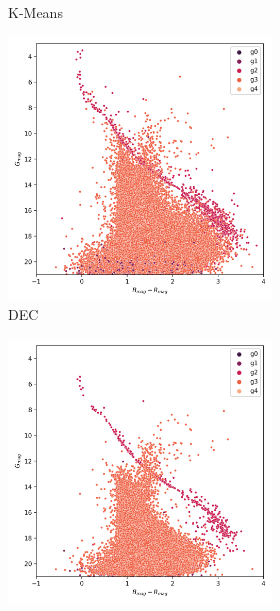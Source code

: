 \documentclass[11pt,a4paper,english,twocolumn]{article}
\begin{document}
\begin{figure}[htbp]
\begin{subfigure}{\columnwidth}
\begin{subfigure}[t]{0.3\textwidth}
      \caption{K-Means}
    \end{subfigure}
    \hfill
    \begin{subfigure}[t]{0.3\textwidth}
      \centering
      \includegraphics[width=\textwidth]{../figures/melotte_22/dec_hr_diagram_melotte_22.png}
      \caption{DEC}
    \end{subfigure}
    \hfill
    \begin{subfigure}[t]{0.3\textwidth}
      \centering
      \includegraphics[width=\textwidth]{../figures/melotte_22/dec_hr_diagram_filtered_melotte_22.png}

\end{subfigure}
\end{subfigure}
\end{figure}
\end{document}
